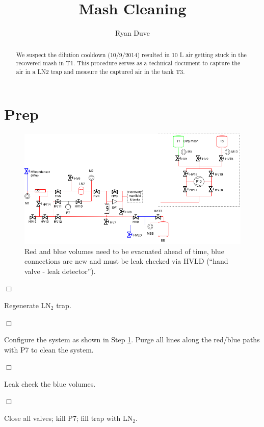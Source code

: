 \documentclass[a4paper,10pt]{article}
\title{Mash Cleaning}
\author{Ryan Duve}
\newenvironment{checklist}{%
  \small
  \begin{list}{}{}%
  
  \setlength{\itemsep}{1pt}
  \setlength{\parskip}{0pt}
  \setlength{\parsep}{0pt}
  
  \let\olditem\item
  \renewcommand\item{{\olditem $\Box$} }
}{%
  \end{list}
}
\begin{document}
\maketitle

\begin{abstract}
\vspace{.1cm}
\vspace{.1cm}

We suspect the dilution cooldown (10/9/2014) resulted in 10 L air getting stuck in the recovered mash in T1.  This procedure serves as a technical document to capture the air in a LN2 trap and measure the captured air in the tank T3.

\end{abstract}

\section{Prep}
\begin{figure}[htbp!]
 \centering
 \includegraphics[width=\textwidth]{./mash-cleaning-01.png}
 \caption{Red and blue volumes need to be evacuated ahead of time, blue connections are new and must be leak checked via HVLD (``hand valve - leak detector'').}
 \label{a}
\end{figure}

\begin{checklist}
 \item Regenerate LN$_2$ trap.
 \item Configure the system as shown in Step \ref{a}. Purge all lines along the red/blue paths with P7 to clean the system.
 \item Leak check the blue volumes.
 \item Close all valves; kill P7; fill trap with LN$_2$.
\end{checklist}
\pagebreak
\end{document}
